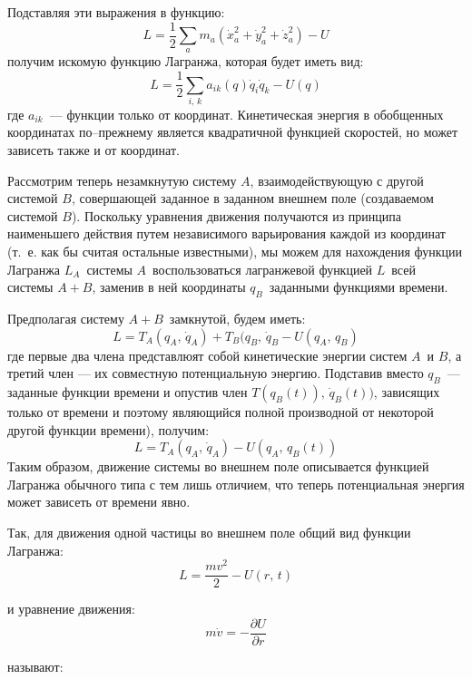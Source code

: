 Подставляя эти выражения в функцию:
$$
L = \frac{1}{2} \sum_a m_a \left(\dot{x}^2_a + \dot{y}^2_a + \dot{z}^2_a
\right) - U
$$
получим искомую функцию Лагранжа, которая будет иметь вид:
\begin{equation}\label{mech22}
L = \frac{1}{2} \sum_{i,\, k} a_{ik} (q)\dot{q}_i \dot{q}_k - U(q)
\end{equation}
где $a_{ik}$\, --- функции только от координат. Кинетическая энергия в
обобщенных координатах по--прежнему является квадратичной функцией
скоростей, но может зависеть также и от координат.

Рассмотрим теперь незамкнутую систему $A$, взаимодействующую с другой
системой $B$, совершающей заданное в заданном внешнем поле (создаваемом
системой $B$). Поскольку уравнения движения получаются из принципа
наименьшего действия путем независимого варьирования каждой из координат
(т.~е. как бы считая остальные известными), мы можем для нахождения
функции Лагранжа $L_A$\, системы $A$\, воспользоваться лагранжевой
функцией $L$\, всей системы $A+B$, заменив в ней координаты $q_B$\,
заданными функциями времени.

Предполагая систему $A+B$\, замкнутой, будем иметь:
$$
L = T_A (q_A,\, \dot{q}_A) + T_B(q_B,\, \dot{q}_B - U(q_A,\, q_B)
$$
где первые два члена представлюят собой кинетические энергии систем
$A$\, и $B$, а третий член --- их совместную потенциальную энергию.
Подставив вместо $q_B$\, --- заданные функции времени и опустив член
$T(q_B(t)),\, \dot{q}_B(t))$, зависящих только от времени и поэтому
являющийся полной производной от некоторой  другой функции времени),
получим:
$$
L = T_A (q_A,\, \dot{q}_A) - U(q_A,\, q_B(t))
$$
Таким образом, движение системы во внешнем поле описывается функцией
Лагранжа обычного типа с тем лишь отличием, что теперь потенциальная
энергия может зависеть от времени явно.

Так, для движения одной частицы во внешнем поле общий вид функции
Лагранжа:
\begin{equation}\label{mech23}
L = \frac{mv^2}{2} - U(r,\, t)
\end{equation}

и уравнение движения:
\begin{equation}\label{mech24}
m\dot{v} = - \frac{\partial U}{\partial r}
\end{equation}
\parbox{69.8pt}{}
	называют:\\[3pt]
\\[3pt]


